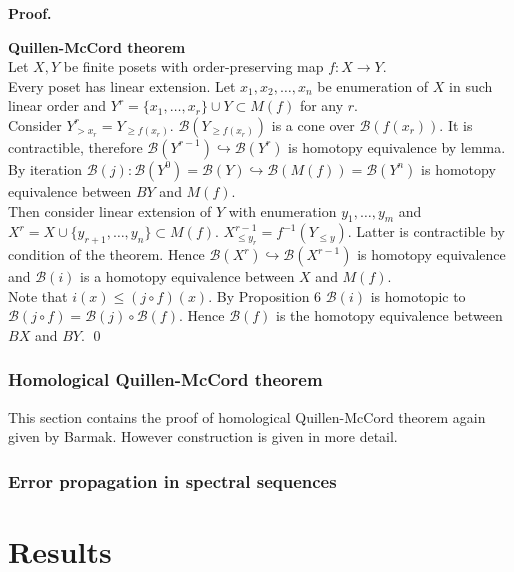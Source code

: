 \documentclass[a4paper, 12pt]{article}
\theoremstyle{definition}
\theoremstyle{remark}
\newenvironment{pf}{\noindent\textbf{Proof.} ~ \par}{\qed}
\renewcommand{\leq}{\leqslant}
\renewcommand{\geq}{\geqslant}
\begin{document}
\begin{pf} \textbf{Quillen-McCord theorem}\\
  Let $X, Y$ be finite posets with order-preserving map $f : X \to Y$.\\

  Every poset has linear extension. Let $x_1, x_2, \ldots, x_n$ be enumeration of $X$ in such linear order and $Y^r = \{x_1,\ldots,x_r\} \cup Y \subset M(f)$ for any $r$.\\

  Consider $Y^r_{>x_r} = Y_{\geq f(x_r)}$. $\mathcal{B}(Y_{\geq f(x_r)})$ is a cone over $\mathcal{B}(f(x_r))$. It is contractible, therefore $\mathcal{B}(Y^{r-1}) \hookrightarrow \mathcal{B}(Y^{r})$ is homotopy equivalence by lemma. By iteration $\mathcal{B}(j) : \mathcal{B}(Y^{0}) = \mathcal{B}(Y) \hookrightarrow \mathcal{B}(M(f)) = \mathcal{B}(Y^n)$ is homotopy equivalence between $BY$ and $M(f)$.\\

  Then consider linear extension of $Y$ with enumeration $y_1,\ldots,y_m$ and $X^r = X \cup \{y_{r+1},\ldots,y_n\} \subset M(f)$. $X^{r-1}_{\leq y_r} = f^{-1}(Y_{\leqslant y})$. Latter is contractible by condition of the theorem. Hence $\mathcal{B}(X^{r}) \hookrightarrow \mathcal{B}(X^{r-1})$ is homotopy equivalence and $\mathcal{B}(i)$ is a homotopy equivalence between $X$ and $M(f)$.\\

  Note that $i(x) \leqslant (j \circ f)(x)$. By Proposition 6 $\mathcal{B}(i)$ is homotopic to $\mathcal{B}(j \circ f) = \mathcal{B}(j) \circ \mathcal{B}(f)$. Hence $\mathcal{B}(f)$ is the homotopy equivalence between $BX$ and $BY$.
\end{pf}

\subsubsection{Homological Quillen-McCord theorem}

This section contains the proof of homological Quillen-McCord theorem again given by Barmak. However construction is given in more detail.

\subsubsection{Error propagation in spectral sequences}

\section{Results}
\end{document}
